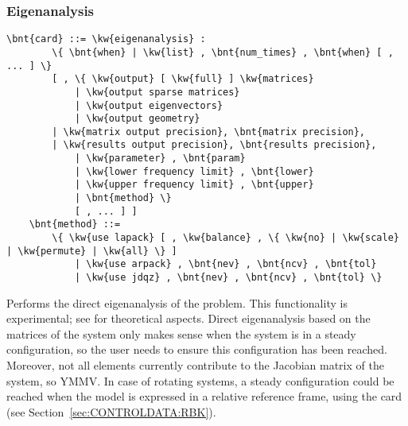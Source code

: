 \subsubsection{Eigenanalysis}
\label{sec:IVP:eigenanalysis}
\begin{Verbatim}[commandchars=\\\{\}]
    \bnt{card} ::= \kw{eigenanalysis} :
        \{ \bnt{when} | \kw{list} , \bnt{num_times} , \bnt{when} [ , ... ] \}
        [ , \{ \kw{output} [ \kw{full} ] \kw{matrices}
            | \kw{output sparse matrices}
            | \kw{output eigenvectors}
            | \kw{output geometry}
	    | \kw{matrix output precision}, \bnt{matrix precision},
	    | \kw{results output precision}, \bnt{results precision},
            | \kw{parameter} , \bnt{param}
            | \kw{lower frequency limit} , \bnt{lower}
            | \kw{upper frequency limit} , \bnt{upper}
            | \bnt{method} \}
            [ , ... ] ]
    \bnt{method} ::=
        \{ \kw{use lapack} [ , \kw{balance} , \{ \kw{no} | \kw{scale} | \kw{permute} | \kw{all} \} ]
            | \kw{use arpack} , \bnt{nev} , \bnt{ncv} , \bnt{tol}
            | \kw{use jdqz} , \bnt{nev} , \bnt{ncv} , \bnt{tol} \} 
\end{Verbatim}
Performs the direct eigenanalysis of the problem.
This functionality is experimental;
see \cite{MASARATI-2009} for theoretical aspects.
Direct eigenanalysis based on the matrices of the system
only makes sense when the system is in a steady configuration,
so the user needs to ensure this configuration has been reached.
Moreover, not all elements currently contribute to the Jacobian
matrix of the system, so YMMV.
In case of rotating systems, a steady configuration could be reached
when the model is expressed in a relative reference frame,
using the  card
(see Section~\ref{sec:CONTROLDATA:RBK}).

